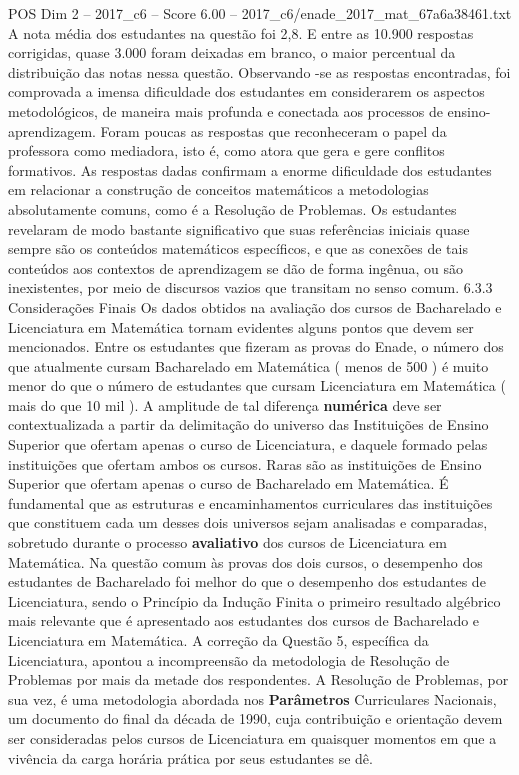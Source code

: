 \begin{textsample}{POS Dim 2 – 2017\_c6 – Score 6.00 – 2017\_c6/enade\_2017\_mat\_67a6a38461.txt}
A nota média dos estudantes na questão foi 2,8.
E entre as 10.900 respostas corrigidas, quase 3.000 foram deixadas em branco, o maior percentual da distribuição das notas nessa questão.
Observando -se as respostas encontradas, foi comprovada a imensa dificuldade dos estudantes em considerarem os aspectos metodológicos, de maneira mais profunda e conectada aos processos de ensino-aprendizagem.
Foram poucas as respostas que reconheceram o papel da professora como mediadora, isto é, como atora que gera e gere conflitos formativos.
As respostas dadas confirmam a enorme dificuldade dos estudantes em relacionar a construção de conceitos matemáticos a metodologias absolutamente comuns, como é a Resolução de Problemas.
Os estudantes revelaram de modo bastante significativo que suas referências iniciais quase sempre são os conteúdos matemáticos específicos, e que as conexões de tais conteúdos aos contextos de aprendizagem se dão de forma ingênua, ou são inexistentes, por meio de discursos vazios que transitam no senso comum. 6.3.3 Considerações Finais Os dados obtidos na avaliação dos cursos de Bacharelado e Licenciatura em Matemática tornam evidentes alguns pontos que devem ser mencionados.
Entre os estudantes que fizeram as provas do Enade, o número dos que atualmente cursam Bacharelado em Matemática ( menos de 500 ) é muito menor do que o número de estudantes que cursam Licenciatura em Matemática ( mais do que 10 mil ).
A amplitude de tal diferença \textbf{numérica} deve ser contextualizada a partir da delimitação do universo das Instituições de Ensino Superior que ofertam apenas o curso de Licenciatura, e daquele formado pelas instituições que ofertam ambos os cursos.
Raras são as instituições de Ensino Superior que ofertam apenas o curso de Bacharelado em Matemática.
É fundamental que as estruturas e encaminhamentos curriculares das instituições que constituem cada um desses dois universos sejam analisadas e comparadas, sobretudo durante o processo \textbf{avaliativo} dos cursos de Licenciatura em Matemática.
Na questão comum às provas dos dois cursos, o desempenho dos estudantes de Bacharelado foi melhor do que o desempenho dos estudantes de Licenciatura, sendo o Princípio da Indução Finita o primeiro resultado algébrico mais relevante que é apresentado aos estudantes dos cursos de Bacharelado e Licenciatura em Matemática.
A correção da Questão 5, específica da Licenciatura, apontou a incompreensão da metodologia de Resolução de Problemas por mais da metade dos respondentes.
A Resolução de Problemas, por sua vez, é uma metodologia abordada nos \textbf{Parâmetros} Curriculares Nacionais, um documento do final da década de 1990, cuja contribuição e orientação devem ser consideradas pelos cursos de Licenciatura em quaisquer momentos em que a vivência da carga horária prática por seus estudantes se dê.

\end{textsample}
